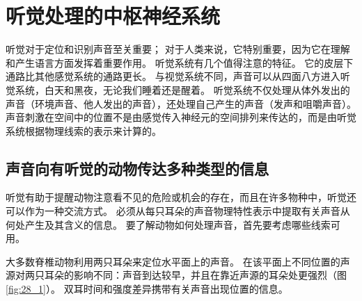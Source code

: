\chapter{听觉处理的中枢神经系统} \label{chap:chap28}
听觉对于定位和识别声音至关重要； 对于人类来说，它特别重要，因为它在理解和产生语言方面发挥着重要作用。
听觉系统有几个值得注意的特征。 它的皮层下通路比其他感觉系统的通路更长。
与视觉系统不同，声音可以从四面八方进入听觉系统，白天和黑夜，无论我们睡着还是醒着。
听觉系统不仅处理从体外发出的声音（环境声音、他人发出的声音），还处理自己产生的声音（发声和咀嚼声音）。
声音刺激在空间中的位置不是由感觉传入神经元的空间排列来传达的，而是由听觉系统根据物理线索的表示来计算的。


\section{声音向有听觉的动物传达多种类型的信息}
听觉有助于提醒动物注意看不见的危险或机会的存在，而且在许多物种中，听觉还可以作为一种交流方式。 必须从每只耳朵的声音物理特性表示中提取有关声音从何处产生及其含义的信息。 要了解动物如何处理声音，首先要考虑哪些线索可用。

大多数脊椎动物利用两只耳朵来定位水平面上的声音。
在该平面上不同位置的声源对两只耳朵的影响不同：声音到达较早，并且在靠近声源的耳朵处更强烈（图\ref{fig:28_1}）。
双耳时间和强度差异携带有关声音出现位置的信息。


